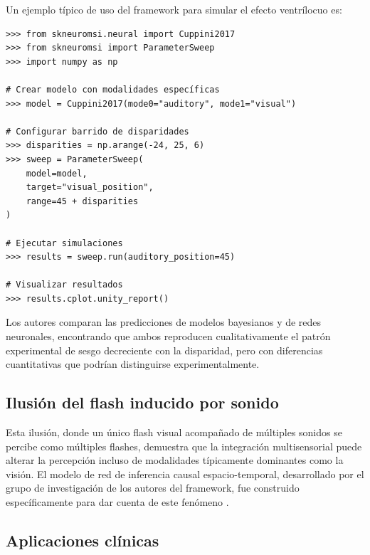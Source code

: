 Un ejemplo típico de uso del framework para simular el efecto ventrílocuo es:

\begin{code}
\begin{verbatim}
>>> from skneuromsi.neural import Cuppini2017
>>> from skneuromsi import ParameterSweep
>>> import numpy as np

# Crear modelo con modalidades específicas
>>> model = Cuppini2017(mode0="auditory", mode1="visual")

# Configurar barrido de disparidades
>>> disparities = np.arange(-24, 25, 6)
>>> sweep = ParameterSweep(
    model=model,
    target="visual_position",
    range=45 + disparities
)

# Ejecutar simulaciones
>>> results = sweep.run(auditory_position=45)

# Visualizar resultados
>>> results.cplot.unity_report()
\end{verbatim}
\caption{
    Ejemplo del uso de Scikit-NeuroMSI para simular el efecto ventrílocuo. Se crea un modelo Cuppini2017 con modalidades auditiva y visual, se configura un barrido de disparidades espaciales, y se visualizan los resultados mediante el accessor de colección.
}
\label{code:usage}
\end{code}
\vspace{1.5em}


Los autores comparan las predicciones de modelos bayesianos y de redes neuronales, encontrando que ambos reproducen cualitativamente el patrón experimental de sesgo decreciente con la disparidad, pero con diferencias cuantitativas que podrían distinguirse experimentalmente.

\subsection{Ilusión del flash inducido por sonido}
\label{subsec:snmsi_flash}

Esta ilusión, donde un único flash visual acompañado de múltiples sonidos se percibe como múltiples flashes, demuestra que la integración multisensorial puede alterar la percepción incluso de modalidades típicamente dominantes como la visión. El modelo de red de inferencia causal espacio-temporal, desarrollado por el grupo de investigación de los autores del framework, fue construido específicamente para dar cuenta de este fenómeno \citep{paredes2025scikit}.


\subsection{Aplicaciones clínicas}
\label{subsec:snmsi_clinicas}

